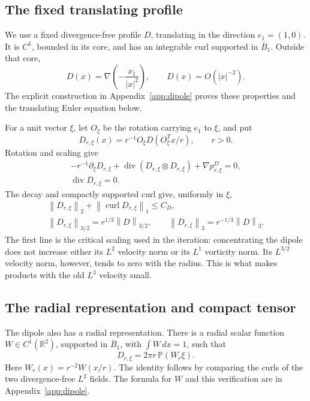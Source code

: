 \documentclass[11pt,a4paper,reqno]{amsart}
\theoremstyle{plain}
\theoremstyle{definition}
\theoremstyle{remark}
\numberwithin{equation}{section}
\newcommand{\R}{\mathbb R}
\newcommand{\PP}{\mathbb P}
\newcommand{\curl}{\operatorname{curl}}
\newcommand{\Div}{\operatorname{div}}
\newcommand{\norm}[2]{\left\|#1\right\|_{#2}}
\newcommand{\dd}{\,dx}
\begin{document}
\subsection{The fixed translating profile}

We use a fixed divergence-free profile $D$, translating in the
direction $e_1=(1,0)$. It is $C^1$, bounded in its core, and has an
integrable curl supported in $\overline B_1$. Outside that core,
\[
 D(x)=\nabla\left(-\frac{x_1}{|x|^2}\right),
 \qquad D(x)=O(|x|^{-2}).
\]
The explicit construction in Appendix~\ref{app:dipole} proves these
properties and the translating Euler equation below.

For a unit vector $\xi$, let $O_\xi$ be the rotation carrying $e_1$ to
$\xi$, and put
\[
 D_{r,\xi}(x)=r^{-1}O_\xi D(O_\xi^Tx/r),\qquad r>0.
\]
Rotation and scaling give
\begin{equation}\label{eq:dipole-equation}
 \begin{gathered}
 -r^{-1}\partial_\xi D_{r,\xi}
       +\Div(D_{r,\xi}\otimes D_{r,\xi})+\nabla p^D_{r,\xi}=0,\\
 \Div D_{r,\xi}=0.
 \end{gathered}
\end{equation}
The decay and compactly supported curl give, uniformly in $\xi$,
\begin{equation}\label{eq:dipole-scaling}
 \begin{gathered}
 \norm{D_{r,\xi}}2+\norm{\curl D_{r,\xi}}1\le C_D,\\
 \norm{D_{r,\xi}}{3/2}=r^{1/3}\norm D{3/2},
 \qquad\norm{D_{r,\xi}}3=r^{-1/3}\norm D3.
 \end{gathered}
\end{equation}
The first line is the critical scaling used in the iteration:
concentrating the dipole does not increase either its $L^2$ velocity
norm or its $L^1$ vorticity norm. Its $L^{3/2}$ velocity norm,
however, tends to zero with the radius. This is what makes products
with the old $L^3$ velocity small.

\subsection{The radial representation and compact tensor}

The dipole also has a radial representation. There is a radial
scalar function $W\in C^1(\R^2)$, supported in $\overline B_1$, with
$\int W\dd=1$, such that
\begin{equation}\label{eq:dipole-projection}
 D_{r,\xi}=2\pi r\,\PP(W_r\xi).
\end{equation}
Here $W_r(x)=r^{-2}W(x/r)$. The identity follows by comparing
the curls of the two divergence-free $L^2$ fields. The formula for
$W$ and this verification are in Appendix~\ref{app:dipole}.
\end{document}
